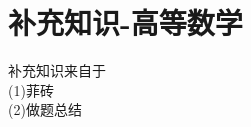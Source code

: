\documentclass[12pt, a4paper, oneside, UTF8]{ctexbook}
\begin{document}

\else
\fi
\chapter {补充知识-高等数学}

\begin{tcolorbox}
    补充知识来自于 \\
    (1)菲砖 \\
    (2)做题总结
\end{tcolorbox}

\ifx\allfiles\undefined
\end{document}
